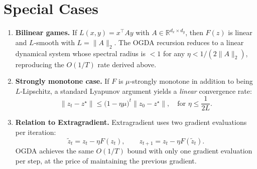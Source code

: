 \documentclass{article}
\begin{document}
\section*{Special Cases}
\begin{enumerate}[label=\alph*)]
\item \textbf{Bilinear games.} If $L(x,y)=x^\top Ay$ with $A\in\mathbb{R}^{d_x\times d_y}$, then $F(z)$ is linear and $L$‑smooth with $L=\|A\|_2$. The OGDA recursion reduces to a linear dynamical system whose spectral radius is $<1$ for any $\eta<1/(2\|A\|_2)$, reproducing the $O(1/T)$ rate derived above.
\item \textbf{Strongly monotone case.} If $F$ is $\mu$‑strongly monotone in addition to being $L$‑Lipschitz, a standard Lyapunov argument yields a \emph{linear} convergence rate:
\[
\|z_t-z^\star\|\le\bigl(1-\eta\mu\bigr)^t\|z_0-z^\star\|,
\quad\text{for }\eta\le\frac{1}{2L}.
\]
\item \textbf{Relation to Extragradient.} Extragradient uses two gradient evaluations per iteration:
\[
\tilde z_t = z_t - \eta F(z_t),\qquad
z_{t+1}=z_t-\eta F(\tilde z_t).
\]
OGDA achieves the same $O(1/T)$ bound with only one gradient evaluation per step, at the price of maintaining the previous gradient.
\end{enumerate}
\end{document}

